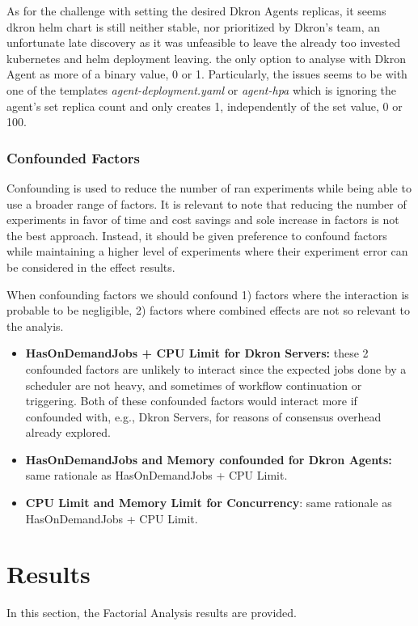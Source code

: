 \documentclass[runningheads]{llncs}
\begin{document}
As for the challenge with setting the desired Dkron Agents replicas, it seems dkron helm chart
is still neither stable, nor prioritized by Dkron's team, an unfortunate late discovery
as it was unfeasible to leave the already too invested kubernetes and helm deployment leaving.
the only option to analyse with Dkron Agent as more of a binary value, 0 or 1.
Particularly, the issues seems to be with one of the templates \textit{agent-deployment.yaml} or
\textit{agent-hpa} which is ignoring the agent's set replica count and only creates 1,
independently of the set value, 0 or 100.



\subsubsection{Confounded Factors}
Confounding is used to reduce the number of ran experiments while being able to use a broader range
of factors. It is relevant to note that reducing the number of experiments in favor of time and cost savings
and sole increase in factors is not the best approach. Instead, it should be given preference to confound
factors while maintaining a higher level of experiments where their experiment error can be considered
in the effect results.

When confounding factors we should confound 1) factors where the interaction is probable to be negligible,
2) factors where combined effects are not so relevant to the analyis.

\begin{itemize}
    \item \textbf{HasOnDemandJobs + CPU Limit for Dkron Servers:} these 2 confounded factors are unlikely to interact since the expected jobs done by
        a scheduler are not heavy, and sometimes of workflow continuation or triggering.
        Both of these confounded factors would interact more if confounded with, e.g., Dkron Servers,
        for reasons of consensus overhead already explored.
    \item \textbf{HasOnDemandJobs and Memory confounded for Dkron Agents:} same rationale as
    HasOnDemandJobs + CPU Limit.
    \item \textbf{CPU Limit and Memory Limit for Concurrency}: same rationale as HasOnDemandJobs
    + CPU Limit.
\end{itemize}



\section{Results}
\label{results}
In this section, the Factorial Analysis results are provided.
\end{document}
